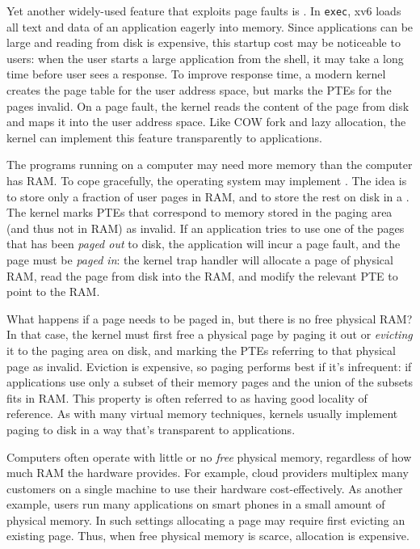 Yet another widely-used feature that exploits page faults is
.  In \lstinline{exec}, xv6 loads all text
and data of an application eagerly into memory.  Since applications
can be large and reading from disk is expensive, this startup cost may
be noticeable to users: when the user starts a large application from
the shell, it may take a long time before user sees a response.  To
improve response time, a modern kernel creates the page table for the
user address space, but marks the PTEs for the pages invalid.  On a
page fault, the kernel reads the content of the page from disk and
maps it into the user address space.  Like COW fork and lazy
allocation, the kernel can implement this feature transparently to
applications.

The programs running on a computer may need more memory than the
computer has RAM. To cope gracefully, the operating system may
implement . The idea is to store only a
fraction of user pages in RAM, and to store the rest on disk in a
. The kernel marks PTEs that correspond to
memory stored in the paging area (and thus not in RAM) as invalid. If
an application tries to use one of the pages that has been {\it paged
  out} to disk, the application will incur a page fault, and the page
must be {\it paged in}: the kernel trap handler will allocate a page
of physical RAM, read the page from disk into the RAM, and modify the
relevant PTE to point to the RAM.

What happens if a page needs to be paged in, but there is no free
physical RAM? In that case, the kernel must first free a physical page
by paging it out or {\it evicting} it to the paging area on disk, and
marking the PTEs referring to that physical page as invalid. Eviction
is expensive, so paging performs best if it's infrequent: if
applications use only a subset of their memory pages and the union of
the subsets fits in RAM. This property is often referred to as having
good locality of reference. As with many virtual memory techniques,
kernels usually implement paging to disk in a way that's transparent
to applications.

Computers often operate with little or no {\it free} physical memory,
regardless of how much RAM the hardware provides. For example, cloud
providers multiplex many customers on a single machine to use their
hardware cost-effectively. As another example, users run many
applications on smart phones in a small amount of physical memory. In
such settings allocating a page may require first evicting an existing
page. Thus, when free physical memory is scarce, allocation is
expensive.

